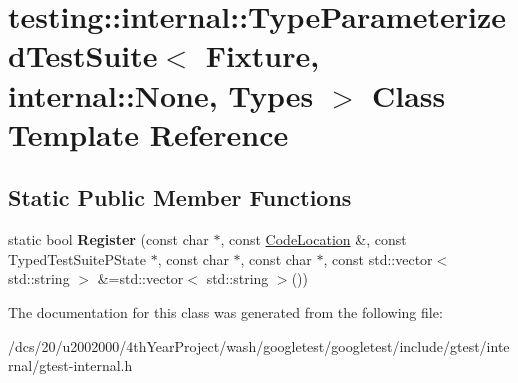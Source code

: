 \hypertarget{classtesting_1_1internal_1_1TypeParameterizedTestSuite_3_01Fixture_00_01internal_1_1None_00_01Types_01_4}{}\section{testing\+:\+:internal\+:\+:Type\+Parameterized\+Test\+Suite$<$ Fixture, internal\+:\+:None, Types $>$ Class Template Reference}
\label{classtesting_1_1internal_1_1TypeParameterizedTestSuite_3_01Fixture_00_01internal_1_1None_00_01Types_01_4}
\subsection*{Static Public Member Functions}
\begin{DoxyCompactItemize}
\item 
\mbox{\label{classtesting_1_1internal_1_1TypeParameterizedTestSuite_3_01Fixture_00_01internal_1_1None_00_01Types_01_4_a571b8fbf0784caec7a04cfc9f79a3665}} 
static bool {\bfseries Register} (const char $\ast$, const \mbox{\hyperlink{structtesting_1_1internal_1_1CodeLocation}{Code\+Location}} \&, const Typed\+Test\+Suite\+P\+State $\ast$, const char $\ast$, const char $\ast$, const std\+::vector$<$ std\+::string $>$ \&=std\+::vector$<$ std\+::string $>$())
\end{DoxyCompactItemize}


The documentation for this class was generated from the following file\+:\begin{DoxyCompactItemize}
\item 
/dcs/20/u2002000/4th\+Year\+Project/wash/googletest/googletest/include/gtest/internal/gtest-\/internal.\+h\end{DoxyCompactItemize}
